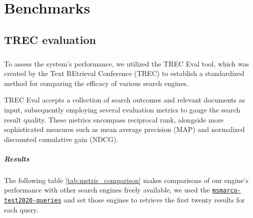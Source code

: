 \chapter{Benchmarks}


\section{TREC evaluation}

\paragraph{}
To assess the system's performance, we utilized the TREC Eval tool, which was created by the Text REtrieval Conference (TREC) to establish a standardized method for comparing the efficacy of various search engines.

TREC Eval accepts a collection of search outcomes and relevant documents as input, subsequently employing several evaluation metrics to gauge the search result quality. These metrics encompass reciprocal rank, alongside more sophisticated measures such as mean average precision (MAP) and normalized discounted cumulative gain (NDCG).

\paragraph{Results}
The following table \ref{tab:metric_comparison} makes comparisons of our engine's performance with other search engines freely available, we used the  \href{https://msmarco.blob.core.windows.net/msmarcoranking/msmarco-test2020-queries.tsv.gz}{\texttt{msmarco-test2020-queries}} and set those engines to retrieve the first twenty results for each query.

